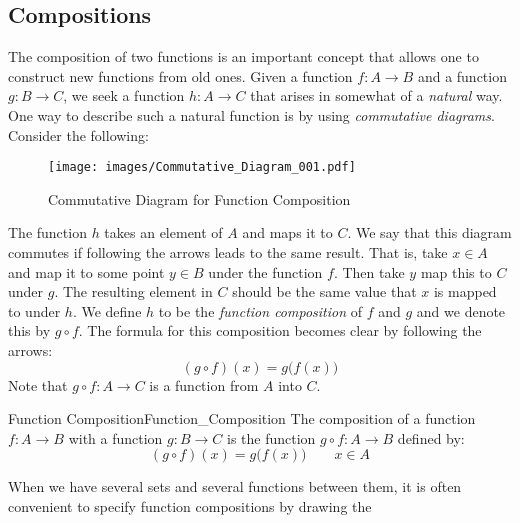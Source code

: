     \subsection{Compositions}
        The composition of two functions is an important concept that allows
        one to construct new functions from old ones. Given a function
        $f:A\rightarrow{B}$ and a function $g:B\rightarrow{C}$, we seek a
        function $h:A\rightarrow{C}$ that arises in somewhat of a
        \textit{natural} way. One way to describe such a natural function is
        by using \textit{commutative diagrams}.
        Consider the following:
        \begin{figure}[H]
            \centering
            \captionsetup{type=figure}
            \texttt{[image: images/Commutative\_Diagram\_001.pdf]}
            \caption{Commutative Diagram for Function Composition}
            \label{fig:Commutative_Diagram_Func_Comp}
        \end{figure}
        The function $h$ takes an element of $A$ and maps it to $C$. We say that
        this diagram commutes if following the arrows leads to the same result.
        That is, take $x\in{A}$ and map it to some point $y\in{B}$ under the
        function $f$. Then take $y$ map this to $C$ under $g$. The resulting
        element in $C$ should be the same value that $x$ is mapped to under $h$.
        We define $h$ to be the
        \textit{function composition} of $f$ and
        $g$ and we denote this by $g\circ{f}$. The formula for this composition
        becomes clear by following the arrows:
        \begin{equation}
            (g\circ{f})(x)=g\big(f(x)\big)
        \end{equation}
        Note that $g\circ{f}:A\rightarrow{C}$ is a function from $A$ into $C$.
        \begin{fdefinition}{Function Composition}{Function_Composition}
            The composition of a function $f:A\rightarrow{B}$ with a function
            $g:B\rightarrow{C}$ is the function $g\circ{f}:A\rightarrow{B}$
            defined by:
            \begin{equation*}
                (g\circ{f})(x)=g\big(f(x)\big)
                \quad\quad
                x\in{A}
            \end{equation*}
        \end{fdefinition}
        When we have several sets and several functions between them, it is
        often convenient to specify function compositions by drawing the
